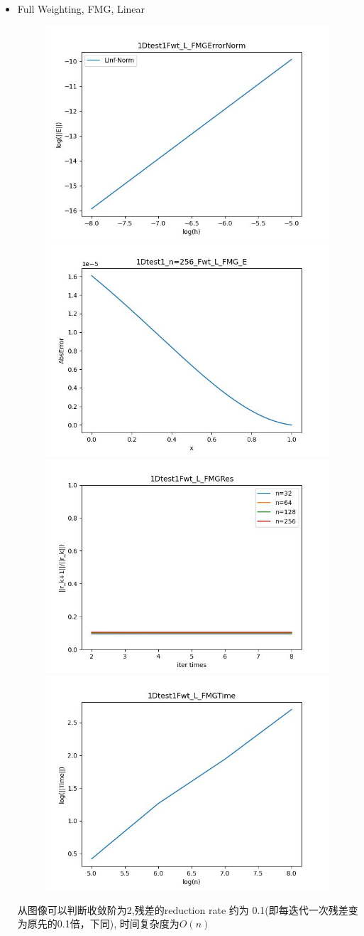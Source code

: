 \documentclass{article}
\begin{document}
\begin{itemize}
    \item Full Weighting, FMG, Linear
    \begin{figure}[h]
        \centering
        \includegraphics[width=0.35\linewidth]{1Dtest1Fwt_L_FMGErrorNorm.jpg}
        \includegraphics[width=0.35\linewidth]{1Dtest1_n=256_Fwt_L_FMG_E.jpg}
        \includegraphics[width=0.35\linewidth]{1Dtest1Fwt_L_FMGRes.jpg}
        \includegraphics[width=0.35\linewidth]{1Dtest1Fwt_L_FMGTime.jpg}
    \end{figure}
    
    从图像可以判断收敛阶为2,残差的reduction rate 约为 0.1(即每迭代一次残差变为原先的0.1倍，下同), 时间复杂度为$O(n)$


\end{itemize}
\end{document}
